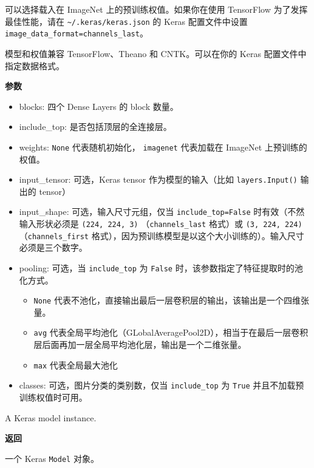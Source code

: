 可以选择载入在 ImageNet 上的预训练权值。如果你在使用 TensorFlow
为了发挥最佳性能，请在 \texttt{\textasciitilde{}/.keras/keras.json} 的
Keras 配置文件中设置
\texttt{image\_data\_format=\textquotesingle{}channels\_last\textquotesingle{}}。

模型和权值兼容 TensorFlow、Theano 和 CNTK。可以在你的 Keras
配置文件中指定数据格式。

\textbf{参数}\label{ux53c2ux6570-7}

\begin{itemize}
\tightlist
\item
  blocks: 四个 Dense Layers 的 block 数量。
\item
  include\_top: 是否包括顶层的全连接层。
\item
  weights: \texttt{None} 代表随机初始化，
  \texttt{\textquotesingle{}imagenet\textquotesingle{}} 代表加载在
  ImageNet 上预训练的权值。
\item
  input\_tensor: 可选，Keras tensor 作为模型的输入（比如
  \texttt{layers.Input()} 输出的 tensor）
\item
  input\_shape: 可选，输入尺寸元组，仅当 \texttt{include\_top=False}
  时有效（不然输入形状必须是 \texttt{(224,\ 224,\ 3)}
  （\texttt{channels\_last} 格式）或 \texttt{(3,\ 224,\ 224)}
  （\texttt{channels\_first}
  格式），因为预训练模型是以这个大小训练的）。输入尺寸必须是三个数字。
\item
  pooling: 可选，当 \texttt{include\_top} 为 \texttt{False}
  时，该参数指定了特征提取时的池化方式。

  \begin{itemize}
  \tightlist
  \item
    \texttt{None}
    代表不池化，直接输出最后一层卷积层的输出，该输出是一个四维张量。
  \item
    \texttt{\textquotesingle{}avg\textquotesingle{}}
    代表全局平均池化（GLobalAveragePool2D），相当于在最后一层卷积层后面再加一层全局平均池化层，输出是一个二维张量。
  \item
    \texttt{\textquotesingle{}max\textquotesingle{}} 代表全局最大池化
  \end{itemize}
\item
  classes: 可选，图片分类的类别数，仅当 \texttt{include\_top} 为
  \texttt{True} 并且不加载预训练权值时可用。
\end{itemize}


A Keras model instance.

\textbf{返回}\label{ux8fd4ux56de-1}

一个 Keras \texttt{Model} 对象。

